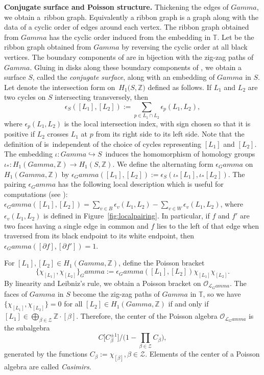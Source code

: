 \documentclass[10pt,a4paper]{amsart}
\numberwithin{equation}{section}
\newcommand{\Z}{{\mathbb Z}}
\newcommand{\C}{{\mathbb C}}
\newcommand{\T}{{\mathbb T}}
\newcommand{\ra}{\rightarrow}
\def\Gamma{Gamma}
\def\widehat#1{#1}
\def\C{C}
\begin{document}
{\bf Conjugate surface and Poisson structure.}
	Thickening the edges of $\Gamma$, we obtain a~ribbon graph. Equivalently a ribbon graph is a graph along with the data of a cyclic order of edges around each vertex. The ribbon graph obtained from $\Gamma$ has the cyclic order induced from the embedding in $\T$. Let \smash{$\widehat \Gamma$} be the ribbon graph obtained from $\Gamma$ by reversing the cyclic order at all black vertices. The boundary components of \smash{$\widehat \Gamma$} are in bijection with the zig-zag paths of~$\Gamma$. Gluing in disks along these boundary components of \smash{$\widehat \Gamma$}, we obtain a surface $\widehat S$, called the \emph{conjugate surface}, along with an embedding of $\Gamma$ in $\widehat S$. Let \smash{$\epsilon_{\widehat S}$} denote the intersection form on~$H_1\big(\widehat S,\Z\big)$ defined as follows. If $L_1$ and $L_2$ are two cycles on $\widehat S$ intersecting transversely, then
	\[
		\epsilon_{\widehat S }([L_1],[L_2]):=\sum_{p \in L_1 \cap L_2} \epsilon_p(L_1,L_2),
	\]
	where $\epsilon_p(L_1,L_2)$ is the local intersection index, with sign chosen so that it is positive if $L_2$ crosses $L_1$ at $p$ from its right side to its left side. {Note that the definition of \smash{$\epsilon_{\widehat S }([L_1],[L_2])$} is~independent of the choice of cycles representing $[L_1]$ and $[L_2]$.} The embedding $\iota\colon \Gamma \hookrightarrow \widehat S$~induces the homomorphism of homology groups $\iota_*\colon H_1(\Gamma,\Z) \ra H_1(\widehat S,\Z)$. We define the alternating form $\epsilon_\Gamma$ on~$H_1(\Gamma,\Z)$ by $\epsilon_\Gamma([L_1],[L_2]):=\epsilon_{\widehat S}(\iota_*[L_1],\iota_*[L_2])$. The pairing $\epsilon_\Gamma$ has the following local description which is useful for computations (see \cite[Appendix]{GK13}): $\epsilon_\Gamma([L_1],[L_2])=\sum_{v \in B} \epsilon_v(L_1,L_2)-\sum_{v \in W} \epsilon_v(L_1,L_2)$, where $\epsilon_v(L_1,L_2)$ is defined in Figure~\ref{fig:localpairing}. In particular, if $f$ and $f'$ are two faces having a single edge in common and $f$ lies to the left of that edge when traversed from its black endpoint to its white endpoint, then $\epsilon_\Gamma([\partial f],[\partial f'])=1$.
	
	
	For ${[L_1]},{[L_2]} \in H_1(\Gamma,\Z)$, define the Poisson bracket
	\[
		\{\chi_{[L_1]},\chi_{[L_2]}\}_\Gamma:=\epsilon_\Gamma([L_1],[L_2])\chi_{[L_1]}\chi_{[L_2]}.
	\]
	By linearity and Leibniz's rule, we obtain a Poisson bracket on $\mathcal O_{\mathcal L_\Gamma}$. The faces of $\Gamma$ in $\widehat S$ become the zig-zag paths of $\Gamma$ in $\T$, so we have $\{\chi_{[L_1]},\chi_{[L_2]}\}=0$ for all $[L_2] \in H_1(\Gamma,\Z)$ if and only if~$[L_1] \in \bigoplus_{\beta \in \mathcal Z} \Z \cdot [\beta]$. Therefore, the center of the Poisson algebra $\mathcal O_{\mathcal L_\Gamma}$ is the subalgebra
	\[
	\C\bigl[C_\beta^{\pm 1}\bigr]/\biggl(1-\prod_{\beta \in \mathcal Z} C_\beta\biggr),
	\]
	generated by the functions $C_\beta:=\chi_{[\beta]}, \beta \in \mathcal Z$. Elements of the center of a Poisson algebra are called \emph{Casimirs}.
	
\end{document}
